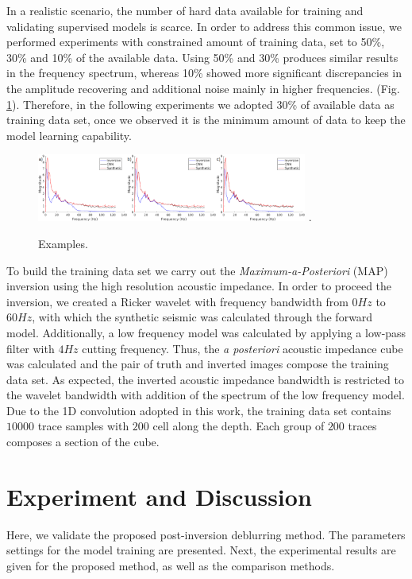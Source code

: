 \documentclass[journal]{IEEEtran}
\begin{document}
In a realistic scenario, the number of hard data available for
training and validating supervised models is scarce. In order
to address this common issue, we performed experiments with
constrained amount of training data, set to 50\%, 30\% and
10\% of the available data. Using 50\% and 30\% 
produces similar results in the frequency spectrum,
whereas 10\% showed more significant discrepancies in the
amplitude recovering and additional noise mainly in higher frequencies.
(Fig. \ref{fig_imgs}). Therefore, in the following experiments
we adopted 30\% of available data as training data set, once we
observed it is the minimum amount of data to keep the model learning
capability.
\begin{figure}[!t]
\centering
\includegraphics[width=3.5in]{Figs/Images}
\DeclareGraphicsExtensions.
\caption{Examples.}
\label{fig_imgs}
\end{figure}

To build the training data set we carry out the \textit{Maximum-a-Posteriori} (MAP)
\cite{Buland2003,Figueiredo2012} inversion using the high resolution acoustic
impedance. In order to proceed the inversion, we created a Ricker wavelet with
frequency bandwidth from $0Hz$ to $60Hz$, with which the synthetic seismic was
calculated through the forward model. Additionally, a low frequency
model was calculated by applying a low-pass filter with $4Hz$ cutting frequency.
Thus, the \textit{a posteriori} acoustic impedance cube was calculated and the pair of truth
and inverted images compose the training data set. As expected, the inverted
acoustic impedance bandwidth is restricted to the wavelet bandwidth with
addition of the spectrum of the low frequency model. Due to the 1D
convolution adopted in this work, the training data set contains $10000$ trace
samples with $200$ cell along the depth. Each group of $200$ traces composes
a section of the cube.

\section{Experiment and Discussion}\label{Experiments}
Here, we validate the proposed post-inversion deblurring method.
The parameters settings for the model training are presented.
Next, the experimental results are given for the proposed method,
as well as the comparison methods.
\end{document}
